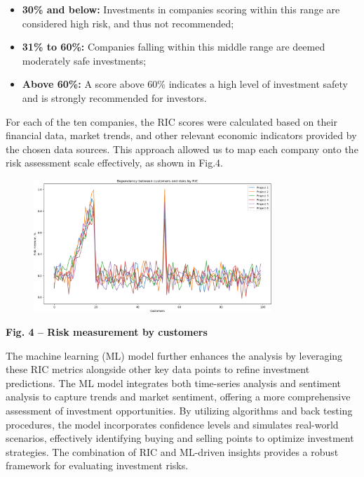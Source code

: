 {\begin{itemize}
\item
  {\bfseries 30\% and below:} Investments in companies scoring within this
  range are considered high risk, and thus not recommended;
\item
  {\bfseries 31\% to 60\%:} Companies falling within this middle range are
  deemed moderately safe investments;
\item
  {\bfseries Above 60\%:} A score above 60\% indicates a high level of
  investment safety and is strongly recommended for investors.
\end{itemize}

For each of the ten companies, the RIC scores were calculated based on
their financial data, market trends, and other relevant economic
indicators provided by the chosen data sources. This approach allowed us
to map each company onto the risk assessment scale effectively, as shown
in Fig.4.

\begin{figure}[H]
	\centering
	\includegraphics[width=0.8\textwidth]{media/ict2/image12}
	\caption*{}
\end{figure}


{\bfseries Fig. 4 -- Risk measurement by customers}

The machine learning (ML) model further enhances the analysis by
leveraging these RIC metrics alongside other key data points to refine
investment predictions. The ML model integrates both time-series
analysis and sentiment analysis to capture trends and market sentiment,
offering a more comprehensive assessment of investment opportunities. By
utilizing algorithms and back testing procedures, the model incorporates
confidence levels and simulates real-world scenarios, effectively
identifying buying and selling points to optimize investment strategies.
The combination of RIC and ML-driven insights provides a robust
framework for evaluating investment risks.

}
